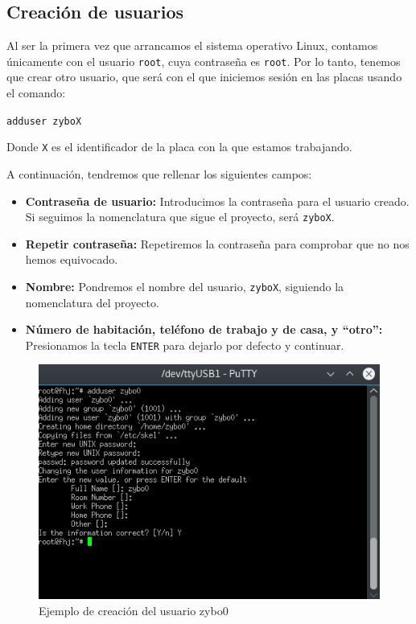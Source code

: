 \newpage
\subsection{Creación de usuarios}
Al ser la primera vez que arrancamos el sistema operativo Linux, contamos únicamente con el usuario \texttt{root}, cuya contraseña es \texttt{root}. Por lo tanto, tenemos que crear otro usuario, que será con el que iniciemos sesión en las placas usando el comando:
\begin{center}
	\texttt{adduser zyboX}
\end{center}
Donde \texttt{X} es el identificador de la placa con la que estamos trabajando.

A continuación, tendremos que rellenar los siguientes campos:
\begin{itemize}
	\item \textbf{Contraseña de usuario:} Introducimos la contraseña para el usuario creado. Si seguimos la nomenclatura que sigue el proyecto, será \texttt{zyboX}.
	\item \textbf{Repetir contraseña:} Repetiremos la contraseña para comprobar que no nos hemos equivocado.
	\item \textbf{Nombre:} Pondremos el nombre del usuario, \texttt{zyboX}, siguiendo la nomenclatura del proyecto.
	\item \textbf{Número de habitación, teléfono de trabajo y de casa, y ``otro'':} Presionamos la tecla \texttt{ENTER} para dejarlo por defecto y continuar.
\end{itemize}

\begin{figure}[h]
	\centering
	\includegraphics[scale=0.9]{Anexos/Anexo2/Linux/NuevoUsuario.png}
	\caption{Ejemplo de creación del usuario zybo0}
	\label{Ejemplo de creación del usuario zybo0}
\end{figure}


